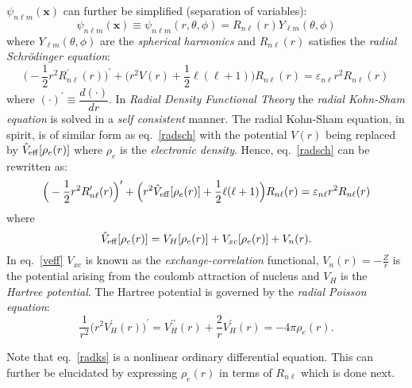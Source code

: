 \documentclass[12pt,dvipsnames]{article}
\newcommand{\vm}[1]{\mathbf{#1}}
\newcommand{\vx}{\vm{x}}
\begin{document}
\noindent
$\psi_{n \ell m} (\vx)$ can further be simplified (separation of variables):
$$\psi_{n \ell m} (\vx) \equiv \psi_{n \ell m} (r, \theta, \phi) = R_{n \ell}(r) Y_{\ell m}(\theta, \phi)$$
where $Y_{\ell m}(\theta, \phi)$ are the \emph{spherical harmonics} and $R_{n \ell}(r)$ satisfies the 
\emph{radial Schr{\"o}dinger equation}:
\begin{equation}	\label{radsch}
\Big( -\frac{1}{2} r^2 R^\prime_{n \ell}(r) \Big)^\prime + \Big( r^2 V(r) + \frac{1}{2} \ell (\ell + 1) \Big ) R_{n \ell}(r) = 
\varepsilon_{n \ell} r^2 R_{n \ell} (r)
\end{equation}
where $(\cdot)^\prime \equiv \dfrac{d(\cdot)}{dr}$.
\noindent
In \emph{Radial Density Functional Theory} the \emph {radial Kohn-Sham equation} is solved in a \emph{self consistent} manner. 
The radial Kohn-Sham equation, in spirit, is of similar form as eq.~\eqref{radsch} with the potential $V(r)$ 
being replaced by $\hat{V}_{\rm{eff}}[\rho_e(r)]$ where $\rho_e$ is the \emph{electronic density}. 
Hence, eq.~\eqref{radsch} can be rewritten as:
\begin{equation}	\label{radks}
\Big( -\frac{1}{2} r^2 R^\prime_{n \ell}(r) \Big)^\prime + \Big( r^2 \hat{V}_{\rm{eff}}[\rho_e(r)] + \frac{1}{2} \ell (\ell + 1) \Big ) R_{n \ell}(r) = 
\varepsilon_{n \ell} r^2 R_{n \ell}(r)
\end{equation}
where 
\begin{equation} \label{veff}
\hat{V}_{\rm{eff}}[\rho_e(r)] = V_H[\rho_e(r)] + V_{xc}[\rho_e(r)] + V_n(r).
\end{equation}
In eq.~\eqref{veff} $V_{xc}$ is known as the \emph{exchange-correlation} functional, 
$V_n(r) = -\frac{Z}{r}$ is the potential arising from the coulomb attraction of nucleus and $V_H$ is 
the \emph{Hartree potential}. The Hartree potential is governed by the \emph{radial Poisson 
equation}:
\begin{equation} \label{radpois}
\frac{1}{r^2} \Big( r^2 V^\prime_H(r) \Big)^\prime = V^{\prime \prime}_H (r) + \frac{2}{r} V^\prime_H(r) = -4 \pi \rho_e(r).
\end{equation}

\noindent
Note that eq.~\eqref{radks} is a nonlinear ordinary differential equation. This can further be 
elucidated by expressing $\rho_e(r)$ in terms of $R_{n \ell}$ which is done next. 
%
\end{document}

